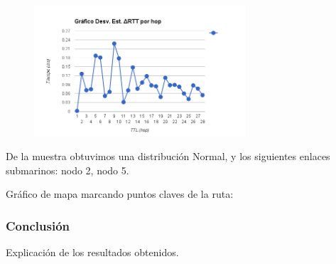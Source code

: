 \begin{figure}[h]
    \includegraphics[width=0.7\textwidth]{img_analisis1/ds_delta_rtt_hop.png}
    
\end{figure}
\vspace{0.25cm}

De la muestra obtuvimos una distribuci\'on Normal, y los siguientes enlaces submarinos: nodo 2, nodo 5.\newline

Gr\'afico de mapa marcando puntos claves de la ruta:

\subsubsection{Conclusi\'on}
Explicaci\'on de los resultados obtenidos.